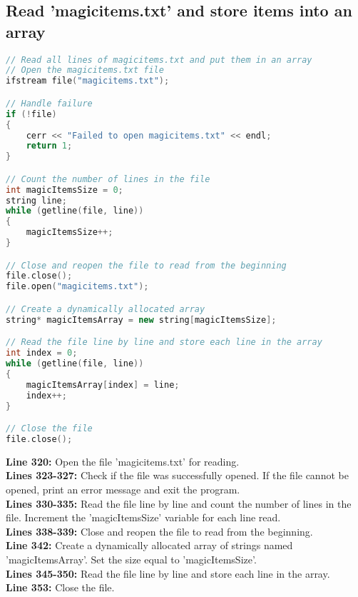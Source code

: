 \documentclass[letterpaper, 10pt,DIV=13]{scrartcl}
\numberwithin{equation}{section} %
\numberwithin{figure}{section} %
\numberwithin{table}{section} %
\begin{document}
\subsection{Read 'magicitems.txt' and store items into an array}
\begin{linenumbers}
\begin{lstlisting}[language=C++, caption={Store Items in Array}, label={code:example}]
// Read all lines of magicitems.txt and put them in an array
// Open the magicitems.txt file
ifstream file("magicitems.txt");

// Handle failure
if (!file) 
{
    cerr << "Failed to open magicitems.txt" << endl;
    return 1;
}

// Count the number of lines in the file
int magicItemsSize = 0;
string line;
while (getline(file, line)) 
{
    magicItemsSize++;
}

// Close and reopen the file to read from the beginning
file.close();
file.open("magicitems.txt");

// Create a dynamically allocated array
string* magicItemsArray = new string[magicItemsSize];

// Read the file line by line and store each line in the array
int index = 0;
while (getline(file, line)) 
{
    magicItemsArray[index] = line;
    index++;
}

// Close the file
file.close();
\end{lstlisting}
\end{linenumbers}
\nolinenumbers

\textbf{Line 320:} Open the file 'magicitems.txt' for reading. \\
\textbf{Lines 323-327:} Check if the file was successfully opened. If the file cannot be opened, print an error message and exit the program. \\
\textbf{Lines 330-335:} Read the file line by line and count the number of lines in the file. Increment the 'magicItemsSize' variable for each line read. \\
\textbf{Lines 338-339:} Close and reopen the file to read from the beginning. \\
\textbf{Line 342:} Create a dynamically allocated array of strings named 'magicItemsArray'. Set the size equal to 'magicItemsSize'. \\
\textbf{Lines 345-350:} Read the file line by line and store each line in the array. \\
\textbf{Line 353:} Close the file.
\end{document}
